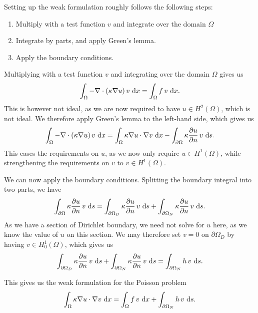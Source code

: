 Setting up the weak formulation roughly follows the following steps:
\begin{enumerate}
    \item Multiply with a test function $v$ and integrate over the domain $\Omega$

    \item Integrate by parts, and apply Green's lemma.

    \item Apply the boundary conditions.
\end{enumerate}
Multiplying with a test function $v$ and integrating over the domain $\Omega$ gives us
\begin{equation}
    \int_\Omega -\nabla \cdot (\kappa \nabla u) \, v \, \mathop{}\!\mathrm{d} x = \int_\Omega f \, v \, \mathop{}\!\mathrm{d} x.
\end{equation}
This is however not ideal, as we are now required to have $u \in H^2(\Omega)$, which is not ideal.
We therefore apply Green's lemma to the left-hand side, which gives us
\begin{equation}
    \int_\Omega -\nabla \cdot (\kappa \nabla u) \, v \, \mathop{}\!\mathrm{d} x
    = \int_\Omega \kappa \nabla u \cdot \nabla v \, \mathop{}\!\mathrm{d} x - \int_{\partial\Omega} \kappa \frac{\partial u}{\partial n} \, v \, \mathop{}\!\mathrm{d} s.
\end{equation}
This eases the requirements on $u$, as we now only require $u \in H^1(\Omega)$, while strengthening the requirements on $v$ to $v \in H^1(\Omega)$.

We can now apply the boundary conditions.
Splitting the boundary integral into two parts, we have
\begin{equation}
    \int_{\partial\Omega} \kappa \frac{\partial u}{\partial n} \, v \, \mathop{}\!\mathrm{d} s = \int_{\partial\Omega_D} \kappa \frac{\partial u}{\partial n} \, v \, \mathop{}\!\mathrm{d} s + \int_{\partial\Omega_N} \kappa \frac{\partial u}{\partial n} \, v \, \mathop{}\!\mathrm{d} s.
\end{equation}
As we have a section of Dirichlet boundary, we need not solve for $u$ here, as we know the value of $u$ on this section.
We may therefore set $v = 0$ on $\partial\Omega_D$ by having $v \in H_0^1(\Omega)$, which gives us
\begin{equation}
    \int_{\partial\Omega_D} \kappa \frac{\partial u}{\partial n} \, v \, \mathop{}\!\mathrm{d} s + \int_{\partial\Omega_N} \kappa \frac{\partial u}{\partial n} \, v \, \mathop{}\!\mathrm{d} s
    = \int_{\partial\Omega_N} h \, v \, \mathop{}\!\mathrm{d} s.
\end{equation}

This gives us the weak formulation for the Poisson problem
\begin{equation}
    \int_\Omega \kappa \nabla u \cdot \nabla v \, \mathop{}\!\mathrm{d} x = \int_\Omega f \, v \, \mathop{}\!\mathrm{d} x + \int_{\partial\Omega_N} h \, v \, \mathop{}\!\mathrm{d} s.
\end{equation}

